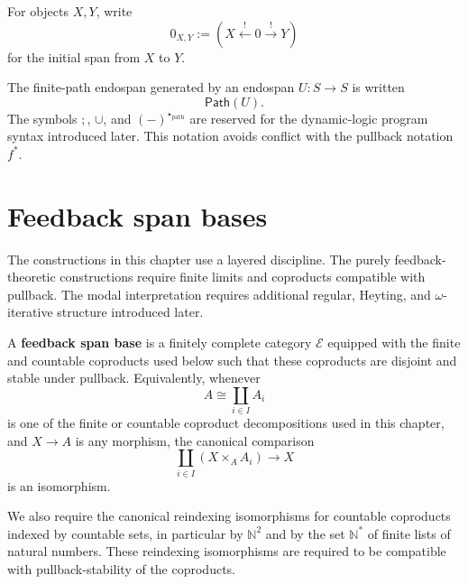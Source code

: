 For objects \(X,Y\), write
\[
  0_{X,Y}
  :=
  \left(
    X\xleftarrow{!}0\xrightarrow{!}Y
  \right)
\]
for the initial span from \(X\) to \(Y\).

The finite-path endospan generated by an endospan \(U:S\to S\) is written
\[
  \mathsf{Path}(U).
\]
The symbols \(;\), \(\cup\), and \((-)^{\star_{\mathrm{path}}}\) are reserved
for the dynamic-logic program syntax introduced later. This notation avoids
conflict with the pullback notation \(f^\ast\).

\section{Feedback span bases}
\label{sec:feedback-span-bases}

The constructions in this chapter use a layered discipline. The purely
feedback-theoretic constructions require finite limits and coproducts
compatible with pullback. The modal interpretation requires additional
regular, Heyting, and \(\omega\)-iterative structure introduced later.

\begin{definition}
\label{def:feedback-span-base}
A \textbf{feedback span base} is a finitely complete category \(\mathcal E\)
equipped with the finite and countable coproducts used below such that these
coproducts are disjoint and stable under pullback. Equivalently, whenever
\[
  A\cong\coprod_{i\in I}A_i
\]
is one of the finite or countable coproduct decompositions used in this
chapter, and \(X\to A\) is any morphism, the canonical comparison
\[
  \coprod_{i\in I}(X\times_A A_i)\longrightarrow X
\]
is an isomorphism.

We also require the canonical reindexing isomorphisms for countable
coproducts indexed by countable sets, in particular by \(\mathbb N^2\) and by
the set \(\mathbb N^\ast\) of finite lists of natural numbers. These
reindexing isomorphisms are required to be compatible with pullback-stability
of the coproducts.
\end{definition}

